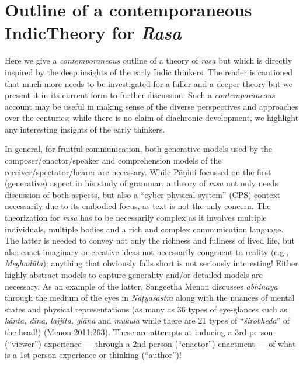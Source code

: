 \section{Outline of a contemporaneous Indic\hfill\break Theory for \textsl{Rasa}}\label{chap3-sec4}

Here we give a \textsl{contemporaneous} outline of a theory of \textsl{rasa} but which is directly inspired by the deep insights of the early Indic thinkers. The reader is cautioned that much more needs to be investigated for a fuller and a deeper theory but we present it in its current form to further discussion. Such a \textsl{contemporaneous} account may be useful in making sense of the diverse perspectives and approaches over the centuries; while there is no claim of diachronic development, we highlight any interesting insights of the early thinkers.

In general, for fruitful communication, both generative models used by the composer/enactor/speaker and comprehension models of the receiver/spectator/hearer are necessary. While Pāṇini focussed on the first (generative) aspect in his study of grammar, a theory of \textsl{rasa} not only needs discussion of both aspects, but also a “cyber-physical-system” (CPS) context necessarily due to its embodied focus, as text is not the only concern. The theorization for \textsl{rasa} has to be necessarily complex as it involves multiple individuals, multiple bodies and a rich and complex communication language. The latter is needed to convey not only the richness and fullness of lived life, but also enact imaginary or creative ideas not necessarily congruent to reality (e.g., \textsl{Meghadūta}); anything that obviously falls short is not seriously interesting! Either highly abstract models to capture generality and/or detailed models are necessary. As an example of the latter, Sangeetha Menon discusses \textsl{abhinaya} through the medium of the eyes in \textsl{Nāṭyaśāstra} along with the nuances of mental states and physical representations (as many as 36 types of eye-glances such as \textsl{kānta, dīna, lajjita, glāna} and \textsl{mukula} while there are 21 types of “\textsl{śirobheda}” of the head!) (Menon 2011:263). These are attempts at inducing a 3rd person (“viewer”) experience --- through a 2nd person (“enactor”) enactment --- of what is a 1st person experience or thinking (“author”)!

